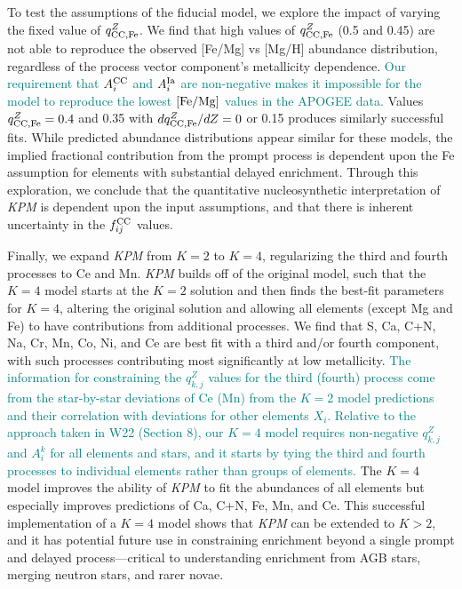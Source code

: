 \documentclass[modern]{aastex631}
\newcommand{\femg}{[{\rm Fe}/{\rm Mg}]}
\newcommand{\qccFe}{q_{{\rm CC, Fe}}^{Z}}
\newcommand{\dqccFe}{dq_{{\rm CC, Fe}}^{Z}/dZ}
\newcommand{\Acc}{A^{\rm CC}_{i}}
\newcommand{\AIa}{A^{\rm Ia}_{i}}
\newcommand{\fcc}{f_{ij}^{\rm CC}}
\newcommand{\add}[1]{\textcolor{teal}{#1}}
\newcommand{\name}{\textsl{KPM}}
\begin{document}
To test the assumptions of the fiducial model, we explore the impact of varying the fixed value of $\qccFe$.
We find that high values of $\qccFe$ (0.5 and 0.45) are not able to reproduce the observed [Fe/Mg] vs [Mg/H] abundance distribution, regardless of the process vector component's metallicity dependence.
\add{Our requirement that $\Acc$ and $\AIa$ are non-negative makes it impossible for the model to reproduce the lowest $\femg$ values in the APOGEE data.} Values $\qccFe = 0.4$ and 0.35 with $\dqccFe = 0$ or 0.15 produces similarly successful fits. While predicted abundance distributions appear similar for these models, the implied fractional contribution from the prompt process is dependent upon the Fe assumption for elements with substantial delayed enrichment. Through this exploration, we conclude that the quantitative nucleosynthetic interpretation of \name{} is dependent upon the input assumptions, and that there is inherent uncertainty in the $\fcc$ values. 

Finally, we expand \name{} from $K=2$ to $K=4$, regularizing the third and fourth processes to Ce and Mn. \name{} builds off of the original model, such that the $K=4$ model starts at the $K=2$ solution and then finds the best-fit parameters for $K=4$, altering the original solution and allowing all elements (except Mg and Fe) to have contributions from additional processes. We find that S, Ca, C+N, Na, Cr, Mn, Co, Ni, and Ce are best fit with a third and/or fourth component, with such processes contributing most significantly at low metallicity. 
\add{The information for constraining the $q^{Z}_{k,j}$ values for the third (fourth) process come from the star-by-star deviations of Ce (Mn) from the $K=2$ model predictions and their correlation with deviations for other elements $X_i$. Relative to the approach taken in W22 (Section 8), our $K=4$ model requires non-negative $q^Z_{k,j}$ and $A_i^k$ for all elements and stars, and it starts by tying the third and fourth processes to individual elements rather than groups of elements.}
The $K=4$ model improves the ability of \name{} to fit the abundances of all elements but especially improves predictions of Ca, C+N, Fe, Mn, and Ce. This successful implementation of a $K=4$ model shows that \name{} can be extended to $K>2$, and it has potential future use in constraining enrichment beyond a single prompt and delayed process---critical to understanding enrichment from AGB stars, merging neutron stars, and rarer novae. 
\end{document}
